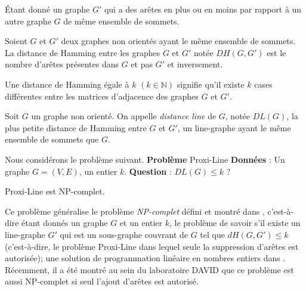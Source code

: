 \'Etant donn\'e un graphe $G'$ qui a des ar\^etes en plus ou en moins par rapport \`a un autre graphe $G$ de m\^eme ensemble de sommets.
\begin{definition}
Soient $G$ et $G'$ deux  graphes non orient\'es ayant le m\^eme ensemble de sommets.
\newline
La distance de Hamming entre les graphes $G$ et $G'$ not\'ee $DH(G,G')$ est le nombre d'ar\^etes pr\'esentes dans $G$ et pas $G'$ et inversement.
\end{definition}
Une distance de Hamming \'egale \`a $k$ $(k \in \mathbb{N})$ signifie qu'il existe $k$ cases diff\'erentes entre les matrices d'adjacence des graphes $G$ et $G'$.


\begin{definition}
Soit $G$ un graphe non orient\'e.
\newline
On appelle {\em distance line} de $G$, not\'ee $DL(G)$, la plus petite distance de Hamming entre $G$ et $G'$, un line-graphe ayant le m\^eme ensemble de sommets que $G$.
\end{definition}


Nous consid\'erons le probl\`eme suivant. \newline
{\bf Probl\`eme} Proxi-Line \newline
{\bf Donn\'ees} : Un graphe $G=(V,E)$, un entier $k$. \newline
{\bf Question} : $DL(G) \le k$ ? 
\newline


\begin{conjecture}
Proxi-Line est NP-complet.
\end{conjecture}

Ce probl\`eme g\'en\'eralise le probl\`eme {\em NP-complet} d\'efini et montr\'e  dans \cite{yannakakis1978node}, c'est-\`a-dire \'etant donn\'es un graphe $ G $ et un entier $k$, le probl\`eme de savoir s'il existe un line-graphe $ G'$ qui est un sous-graphe couvrant de $ G $ tel que $ dH (G, G' ) \leq k $ (c'est-\`a-dire, le probl\`eme Proxi-Line dans lequel seule la suppression d'ar\^etes  est autoris\'ee); une solution de programmation lin\'eaire en nombres entiers   dans \cite{Halldorsson2013}. R\'ecemment, il a \'et\'e montr\'e au sein du laboratoire DAVID que ce probl\`eme est aussi NP-complet si seul l'ajout d'ar\^etes est autoris\'e.
